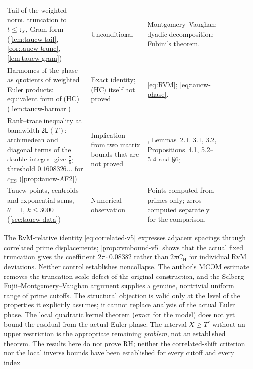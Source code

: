 \documentclass[11pt,a4paper]{article}
\numberwithin{equation}{section}
\theoremstyle{definition}
\theoremstyle{remark}
\begin{document}
\begin{longtable}{@{}p{0.34\linewidth}>{\raggedright\arraybackslash}p{0.23\linewidth}p{0.31\linewidth}@{}}
Tail of the weighted norm, truncation to $t\le\mathsf t_X$, Gram form (\cref{lem:taucw-tail}, \cref{cor:taucw-trunc}, \cref{lem:taucw-gram}) & Unconditional & Montgomery--Vaughan; dyadic decomposition; Fubini's theorem.\\
Harmonics of the phase as quotients of weighted Euler products; equivalent form of (HC) (\cref{lem:taucw-harmar}) & Exact identity; (HC) itself not proved & \eqref{eq:RVM}; \eqref{eq:taucw-phase}.\\
Rank--trace inequality at bandwidth $2\mathsf L(T)$: archimedean and diagonal terms of the double integral give $\frac76$; threshold $0.1608326\ldots$ for $c_{\mathrm{HS}}$ (\cref{prop:taucw-AF2}) & Implication from two matrix bounds that are not proved & \cite{AlpogeFurman2026}, Lemmas~2.1, 3.1, 3.2, Propositions~4.1, 5.2--5.4 and \S6; \cite{Lamzouri2026}.\\
Taucw points, centroids and exponential sums, $\theta=1$, $k\le3000$ (\cref{sec:taucw-data}) & Numerical observation & Points computed from primes only; zeros computed separately for the comparison.\\
\bottomrule
\end{longtable}
\endgroup
The RvM-relative identity \eqref{eq:correlated-v5} expresses adjacent spacings through correlated prime displacements; \cref{prop:rvmbound-v5} shows that the actual fixed truncation gives the coefficient $2\pi\cdot0.08382$ rather than $2\pi C_{\mathrm H}$ for individual RvM deviations. Neither control establishes noncollapse. The author's MCOM estimate removes the truncation-scale defect of the original construction, and the Selberg--Fujii--Montgomery--Vaughan argument supplies a genuine, nontrivial uniform range of prime cutoffs. The structural objection is valid only at the level of the properties it explicitly assumes; it cannot replace analysis of the actual Euler phase. The local quadratic kernel theorem (exact for the model) does not yet bound the residual from the actual Euler phase. The interval $X\ge T^\varepsilon$ without an upper restriction is the appropriate remaining \emph{problem}, not an established theorem. The results here do not prove RH; neither the correlated-shift criterion nor the local inverse bounds have been established for every cutoff and every index.
\end{document}
